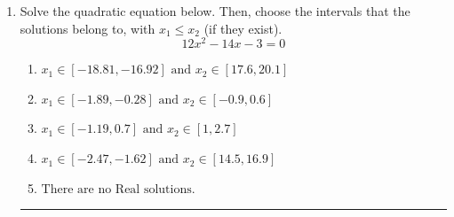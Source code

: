 \documentclass[14pt]{extbook}
\newcommand{\litem}[1]{\item#1\hspace*{-1cm}\rule{\textwidth}{0.4pt}}
\begin{document}
\begin{enumerate}
{\begin{enumerate}[label=\Alph*.]
\end{enumerate} }
\litem{
Solve the quadratic equation below. Then, choose the intervals that the solutions belong to, with $x_1 \leq x_2$ (if they exist).\[ 12x^{2} -14 x -3 = 0 \]\begin{enumerate}[label=\Alph*.]
\item \( x_1 \in [-18.81, -16.92] \text{ and } x_2 \in [17.6, 20.1] \)
\item \( x_1 \in [-1.89, -0.28] \text{ and } x_2 \in [-0.9, 0.6] \)
\item \( x_1 \in [-1.19, 0.7] \text{ and } x_2 \in [1, 2.7] \)
\item \( x_1 \in [-2.47, -1.62] \text{ and } x_2 \in [14.5, 16.9] \)
\item \( \text{There are no Real solutions.} \)

\end{enumerate} }
\end{enumerate}
\end{document}
